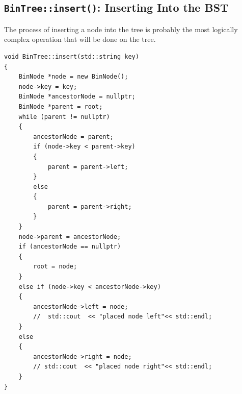 \documentclass[letterpaper, 10pt]{article}
\begin{document}
\subsection{\texttt{BinTree::insert()}: Inserting Into the BST}

The process of inserting a node into the tree is probably the most logically complex operation that will be done on the tree.


 \begin{addmargin}[-5em]{1em}
\begin{small}
\begin{verbatim}
void BinTree::insert(std::string key)
{
    BinNode *node = new BinNode();
    node->key = key;
    BinNode *ancestorNode = nullptr;
    BinNode *parent = root;
    while (parent != nullptr)
    {
        ancestorNode = parent;
        if (node->key < parent->key)
        {
            parent = parent->left;
        }
        else
        {
            parent = parent->right;
        }
    }
    node->parent = ancestorNode;
    if (ancestorNode == nullptr)
    {
        root = node;
    }
    else if (node->key < ancestorNode->key)
    {
        ancestorNode->left = node;
        //  std::cout  << "placed node left"<< std::endl;
    }
    else
    {
        ancestorNode->right = node;
        // std::cout  << "placed node right"<< std::endl;
    }
}
\end{verbatim}
\end{small}
\end{addmargin}
\end{document}
